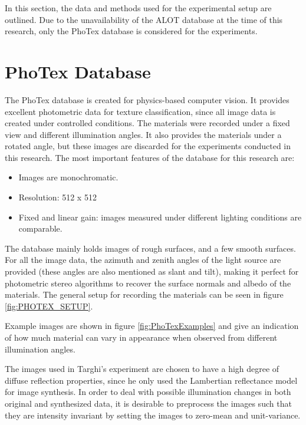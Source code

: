 \hypertarget{Approach}{
}
In this section, the data and methods used for the experimental setup are outlined. Due to the unavailability of the ALOT database at the time of this research, only the PhoTex database is considered for the experiments. 

\section{PhoTex Database}\label{sec:PhoTex}
The PhoTex database is created for physics-based computer vision. It provides excellent photometric data for texture classification, since all image data is  created under controlled conditions. The materials were recorded under a fixed view and different illumination angles. It also provides the materials under a rotated angle, but these images are discarded for the experiments conducted in this research. The most important features of the database for this research are:

\begin{itemize}
	\item Images are monochromatic.
	\item Resolution: 512 x 512
	\item Fixed and linear gain: images measured under different lighting conditions are comparable. 
\end{itemize}

\noindent The database mainly holds images of rough surfaces, and a few smooth surfaces. For all the image data, the azimuth and zenith angles of the light source are provided (these angles are also mentioned as slant and tilt), making it perfect for photometric stereo algorithms to recover the surface normals and albedo of the materials. The general setup for recording the materials can be seen in figure \ref{fig:PHOTEX_SETUP}. 

Example images are shown in figure \ref{fig:PhoTexExamples} and give an indication of how much material can vary in appearance when observed from different illumination angles.

The images used in Targhi's experiment are chosen to have a high degree of diffuse reflection properties, since he only used the Lambertian reflectance model for image synthesis. In order to deal with possible illumination changes in both original and synthesized data, it is desirable to preprocess the images such that they are intensity invariant by setting the images to zero-mean and unit-variance. 

